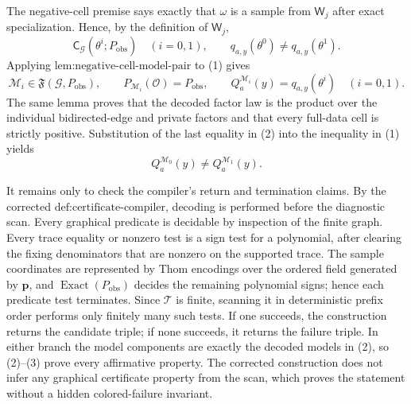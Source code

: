 The negative-cell premise says exactly that \(\omega\) is a sample from \(\mathsf W_j\) after exact specialization. Hence, by the definition of \(\mathsf W_j\),
\[
\mathsf C_{\mathcal G}(\theta^i;P_{\mathrm{obs}})
\quad(i=0,1),
\qquad
q_{a,y}(\theta^0)\neq q_{a,y}(\theta^1).
\tag{1}
\]
Applying \(\text{lem:negative-cell-model-pair}\) to (1) gives
\[
\mathcal M_i\in\mathfrak F(\mathcal G,P_{\mathrm{obs}}),
\qquad
P_{\mathcal M_i}(\mathcal O)=P_{\mathrm{obs}},
\qquad
Q_a^{\mathcal M_i}(y)=q_{a,y}(\theta^i)
\quad(i=0,1).
\tag{2}
\]
The same lemma proves that the decoded factor law is the product over the individual bidirected-edge and private factors and that every full-data cell is strictly positive. Substitution of the last equality in (2) into the inequality in (1) yields
\[
Q_a^{\mathcal M_0}(y)\neq Q_a^{\mathcal M_1}(y).
\tag{3}
\]

It remains only to check the compiler's return and termination claims. By the corrected \(\text{def:certificate-compiler}\), decoding is performed before the diagnostic scan. Every graphical predicate is decidable by inspection of the finite graph. Every trace equality or nonzero test is a sign test for a polynomial, after clearing the fixing denominators that are nonzero on the supported trace. The sample coordinates are represented by Thom encodings over the ordered field generated by \(\mathbf p\), and \(\operatorname{Exact}(P_{\mathrm{obs}})\) decides the remaining polynomial signs; hence each predicate test terminates. Since \(\mathcal T\) is finite, scanning it in deterministic prefix order performs only finitely many such tests. If one succeeds, the construction returns the candidate triple; if none succeeds, it returns the failure triple. In either branch the model components are exactly the decoded models in (2), so (2)--(3) prove every affirmative property. The corrected construction does not infer any graphical certificate property from the scan, which proves the statement without a hidden colored-failure invariant.